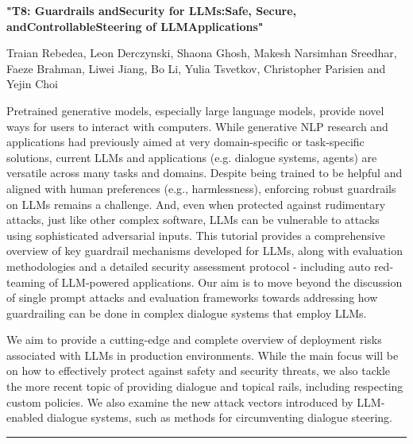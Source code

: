 \begin{center}
    \Large{\textbf{"T8: Guardrails andSecurity for LLMs:Safe, Secure, andControllableSteering of LLMApplications"}\\}
    \par\bigskip
    \large{Traian Rebedea, Leon Derczynski, Shaona Ghosh, Makesh Narsimhan Sreedhar, \\
Faeze Brahman, Liwei Jiang, Bo Li, Yulia Tsvetkov, Christopher Parisien and Yejin Choi}\\
    \par\bigskip

\end{center}

Pretrained generative models, especially large language models, provide novel ways for users to interact with computers. While generative NLP research and applications had previously aimed at very domain-specific or task-specific solutions, current LLMs and applications (e.g. dialogue systems, agents) are versatile across many tasks and domains. Despite being trained to be helpful and aligned with human preferences (e.g., harmlessness), enforcing robust guardrails on LLMs remains a challenge. And, even when protected against rudimentary attacks, just like other complex software, LLMs can be vulnerable to attacks using sophisticated adversarial inputs. This tutorial provides a comprehensive overview of key guardrail mechanisms developed for LLMs, along with evaluation methodologies and a detailed security assessment protocol - including auto red-teaming of LLM-powered applications. Our aim is to move beyond the discussion of single prompt attacks and evaluation frameworks towards addressing how guardrailing can be done in complex dialogue systems that employ LLMs.

We aim to provide a cutting-edge and complete overview of deployment risks associated with LLMs in production environments. While the main focus will be on how to effectively protect against safety and security threats, we also tackle the more recent topic of providing dialogue and topical rails, including respecting custom policies. We also examine the new attack vectors introduced by LLM-enabled dialogue systems, such as methods for circumventing dialogue steering.
\begin{center}
    \noindent\rule{200px}{1pt}
\end{center}
